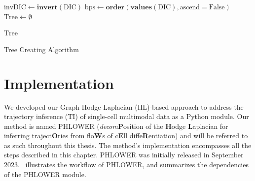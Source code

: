 \begin{algorithm}
    $\text{invDIC} \gets \textbf{invert}(\text{DIC})$ 
    $\text{bps} \gets \textbf{order}(\textbf{values}(\text{DIC}), \text{ascend}=\text{False})$ 
    $\text{Tree} \gets \emptyset$\\

    \Return $\text{Tree}$
    \caption{Tree Creating Algorithm}
    \label{alg:treecreating}
\end{algorithm}


\section{Implementation}
\label{TI_methods:implementation}
We developed our Graph Hodge Laplacian (HL)-based approach to address the trajectory inference (TI) of single-cell multimodal data as a Python module. Our method is named PHLOWER (\textit{decom}\textbf{P}osition of the \textbf{H}odge \textbf{L}aplacian for inferring traject\textbf{O}ries from flo\textbf{W}s of c\textbf{E}ll diffe\textbf{R}entiation) and will be referred to as such throughout this thesis. The method's implementation encompasses all the steps described in this chapter. PHLOWER was initially released in September 2023.~ illustrates the workflow of PHLOWER, and  summarizes the dependencies of the PHLOWER module.

